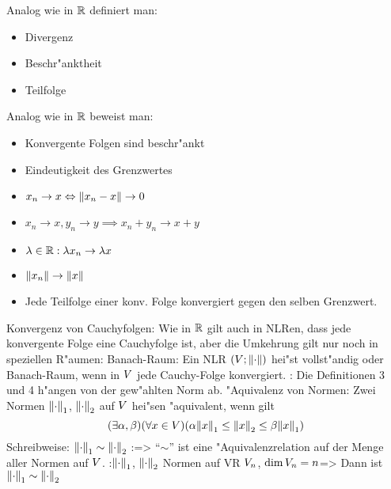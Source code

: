 \remark Analog wie in $\mathbb R$ definiert man:{
  \begin{itemize}
    \item Divergenz
    \item Beschr"anktheit
    \item Teilfolge
    \end{itemize}
  }
\remark Analog wie in $\mathbb R$ beweist man:{
  \begin{itemize}
    \item Konvergente Folgen sind beschr"ankt
    \item Eindeutigkeit des Grenzwertes
    \item $x_n\to x \Leftrightarrow {\left\| x_n-x\right\|}\to 0$
    \item $x_n\to x,y_n\to y \implies x_n+y_n\to x+y$
    \item $\lambda\in\mathbb R: \lambda x_n\to\lambda x$
    \item ${\left\| x_n\right\|}\to {\left\| x\right\|}$
    \item Jede Teilfolge einer konv. Folge konvergiert gegen den selben Grenzwert.
    \end{itemize}
  }
\remark Konvergenz von Cauchyfolgen:{
  Wie in $\mathbb R$ gilt auch in NLRen, dass jede konvergente Folge eine
  Cauchyfolge ist, aber die Umkehrung gilt nur noch in speziellen R"aumen:
  }
 Banach-Raum:{
  Ein NLR $(V;{\left\| \cdot\right\|})$ hei"st vollst"andig oder Banach-Raum, wenn in 
  $V$ jede Cauchy-Folge konvergiert.
  }
\remark:{
  Die Definitionen 3 und 4 h"angen von der gew"ahlten Norm ab.
  }
 "Aquivalenz von Normen:{
  Zwei Normen ${\left\| \cdot\right\|}_1$, ${\left\| \cdot\right\|}_2$ auf $V$ hei"sen "aquivalent, wenn
  gilt
  \[(\exists \alpha,\beta)(\forall x\in V)(\alpha{\left\| x\right\|}_1\leq{\left\| x\right\|}_2\leq\beta{\left\| x\right\|}_1)
    \]
  Schreibweise: ${\left\| \cdot\right\|}_1\sim{\left\| \cdot\right\|}_2$
  }
\theorem:=>{
  ``$\sim$'' ist eine "Aquivalenzrelation auf der Menge aller Normen auf $V$.
  }
\theorem:${\left\| \cdot\right\|}_1$, ${\left\| \cdot\right\|}_2$ Normen auf VR $V_n$, $\dim V_n=n$=>{
  Dann ist ${\left\| \cdot\right\|}_1\sim{\left\| \cdot\right\|}_2$
  }
